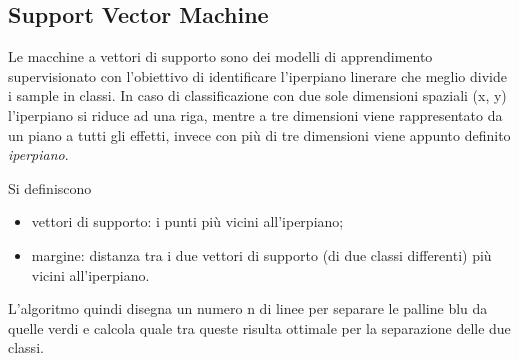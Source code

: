 \documentclass[12pt,a4paper]{article}
\begin{document}
\subsection{Support Vector Machine}
Le macchine a vettori di supporto sono dei modelli di apprendimento supervisionato con l'obiettivo di identificare l'iperpiano linerare che meglio divide i sample in classi. In caso di classificazione con due sole dimensioni spaziali (x, y) l'iperpiano si riduce ad una riga, mentre a tre dimensioni viene rappresentato da un piano a tutti gli effetti, invece con più di tre dimensioni viene appunto definito \textit{iperpiano}.

Si definiscono
\begin{itemize}
    \item vettori di supporto: i punti più vicini all'iperpiano;
    \item margine: distanza tra i due vettori di supporto (di due classi differenti) più vicini all'iperpiano.
\end{itemize}

\begin{figure}[H]
    \centering
    \caption{}
\end{figure}



L'algoritmo quindi disegna un numero n di linee per separare le palline blu da quelle verdi e calcola quale tra queste risulta ottimale per la separazione delle due classi.
\end{document}
